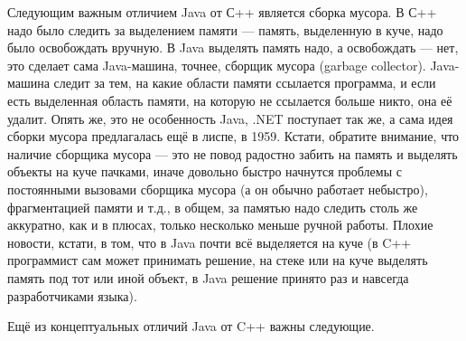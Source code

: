 \documentclass[a5paper]{article}
\begin{document}
Следующим важным отличием Java от С++ является сборка мусора. В С++ надо было следить за выделением памяти --- память, выделенную в куче, надо было освобождать вручную. В Java выделять память надо, а освобождать --- нет, это сделает сама Java-машина, точнее, сборщик мусора (garbage collector). Java-машина следит за тем, на какие области памяти ссылается программа, и если есть выделенная область памяти, на которую не ссылается больше никто, она её удалит. Опять же, это не особенность Java, .NET поступает так же, а сама идея сборки мусора предлагалась ещё в лиспе, в 1959. Кстати, обратите внимание, что наличие сборщика мусора --- это не повод радостно забить на память и выделять объекты на куче пачками, иначе довольно быстро начнутся проблемы с постоянными вызовами сборщика мусора (а он обычно работает небыстро), фрагментацией памяти и т.д., в общем, за памятью надо следить столь же аккуратно, как и в плюсах, только несколько меньше ручной работы. Плохие новости, кстати, в том, что в Java почти всё выделяется на куче (в C++ программист сам может принимать решение, на стеке или на куче выделять память под тот или иной объект, в Java решение принято раз и навсегда разработчиками языка).

Ещё из концептуальных отличий Java от C++ важны следующие.
\end{document}
